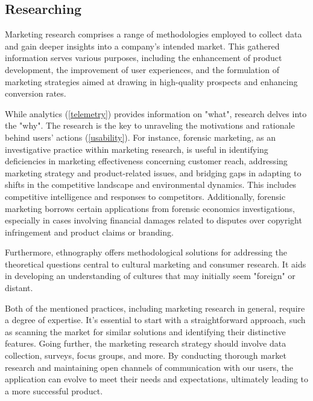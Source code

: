 
\subsection{Researching}

Marketing research comprises a range of methodologies \cite{Este21} employed to collect data and gain deeper insights 
into a company's intended market. This gathered information serves various purposes, including the enhancement of 
product development, the improvement of user experiences, and the formulation of marketing strategies aimed at drawing 
in high-quality prospects and enhancing conversion rates.

While analytics (\ref{telemetry}) provides information on "what", research delves into the "why". The research
is the key to unraveling the motivations and rationale behind users' actions (\ref{usability}). For instance, forensic 
marketing, as an investigative practice within marketing research, is useful in identifying deficiencies in marketing 
effectiveness concerning customer reach, addressing marketing strategy and product-related issues, and bridging gaps in 
adapting to shifts in the competitive landscape and environmental dynamics. This includes competitive intelligence and 
responses to competitors. Additionally, forensic marketing borrows certain applications from forensic economics 
investigations, especially in cases involving financial damages related to disputes over copyright infringement and 
product claims or branding.

Furthermore, ethnography \cite{Mois06} offers methodological solutions for addressing the theoretical questions central 
to cultural marketing and consumer research. It aids in developing an understanding of cultures that may initially 
seem "foreign" or distant.

Both of the mentioned practices, including marketing research in general, require a degree of expertise. It's essential 
to start with a straightforward approach, such as scanning the market for similar solutions  and identifying 
their distinctive features. Going further, the marketing research strategy should involve data collection, surveys, 
focus groups, and more. By conducting thorough market research and maintaining open channels of communication with our 
users, the application can evolve to meet their needs and expectations, ultimately leading to a more successful product.
